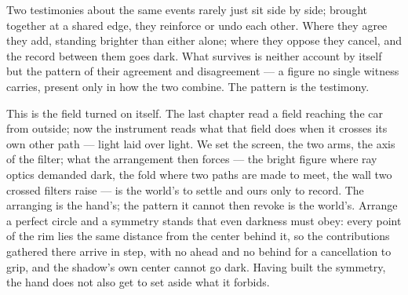 %
%
%
%

\noindent Two testimonies about the same events rarely just sit side by side; brought together at a shared
edge, they reinforce or undo each other. Where they agree they add, standing brighter than either alone; where
they oppose they cancel, and the record between them goes dark. What survives is neither account by itself but
the pattern of their agreement and disagreement --- a figure no single witness carries, present only in how the
two combine. The pattern is the testimony.

This is the field turned on itself. The last chapter read a field reaching the car from outside; now the
instrument reads what that field does when it crosses its own other path --- light laid over light. We set the
screen, the two arms, the axis of the filter; what the arrangement then forces --- the bright figure where ray
optics demanded dark, the fold where two paths are made to meet, the wall two crossed filters raise --- is the
world's to settle and ours only to record. The arranging is the hand's; the pattern it cannot then revoke is
the world's. Arrange a perfect circle and a symmetry stands that even darkness must obey: every point of the
rim lies the same distance from the center behind it, so the contributions gathered there arrive in step, with
no ahead and no behind for a cancellation to grip, and the shadow's own center cannot go dark. Having built the
symmetry, the hand does not also get to set aside what it forbids.

